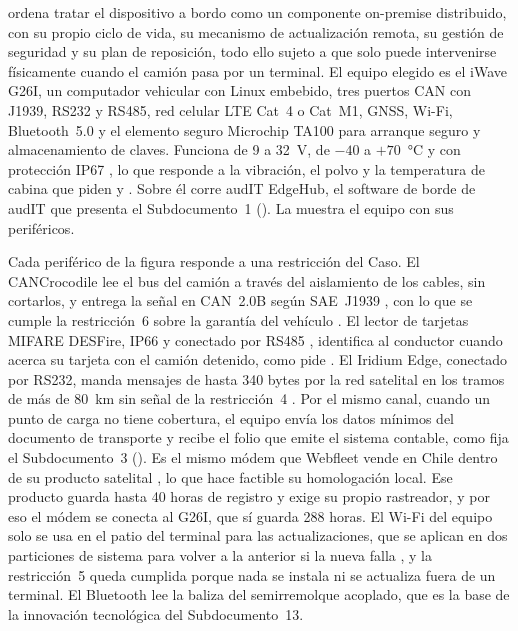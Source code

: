  ordena tratar el dispositivo a bordo como un componente on-premise distribuido,
con su propio ciclo de vida, su mecanismo de actualización remota, su gestión de seguridad y su plan
de reposición, todo ello sujeto a que solo puede intervenirse físicamente cuando el camión pasa por un
terminal. El equipo elegido es el iWave G26I, un computador vehicular con Linux embebido, tres puertos
CAN con J1939, RS232 y RS485, red celular LTE Cat~4 o Cat~M1, GNSS, Wi-Fi, Bluetooth~5.0 y el elemento
seguro Microchip TA100 para arranque seguro y almacenamiento de claves. Funciona de 9 a 32~V, de
$-40$ a $+70$~°C y con protección IP67 \parencite{iwave_g26i}, lo que responde a la vibración, el polvo
y la temperatura de cabina que piden  y . Sobre él corre audIT EdgeHub, el software de
borde de audIT que presenta el Subdocumento~1 (). La  muestra el equipo con sus periféricos.


Cada periférico de la figura responde a una restricción del Caso. El CANCrocodile lee el bus del camión
a través del aislamiento de los cables, sin cortarlos, y entrega la señal en CAN~2.0B según SAE~J1939
\parencite{technoton_cancrocodile}, con lo que se cumple la restricción~6 sobre la garantía del
vehículo . El lector de tarjetas MIFARE DESFire, IP66 y conectado por RS485
\parencite{gao_desfire}, identifica al conductor cuando acerca su tarjeta con el camión detenido, como
pide . El Iridium Edge, conectado por RS232, manda mensajes de hasta 340 bytes por
la red satelital \parencite{groundcontrol_edge} en los tramos de más de 80~km sin señal de la
restricción~4 . Por el mismo canal, cuando un punto de carga no tiene
cobertura, el equipo envía los datos mínimos del documento de transporte y recibe el folio que emite el
sistema contable, como fija el Subdocumento~3 (). Es el mismo módem que Webfleet vende en Chile dentro de su
producto satelital \parencite{webfleet_sat_cl}, lo que hace factible su homologación local. Ese
producto guarda hasta 40 horas de registro y exige su propio rastreador, y por eso el módem se conecta
al G26I, que sí guarda 288 horas. El Wi-Fi del equipo solo se usa en el patio del terminal para las
actualizaciones, que se aplican en dos particiones de sistema para volver a la anterior si la nueva
falla \parencite{mender_variables}, y la restricción~5 queda cumplida porque nada se instala ni se
actualiza fuera de un terminal. El Bluetooth lee la baliza del semirremolque acoplado, que es la base
de la innovación tecnológica del Subdocumento~13.

